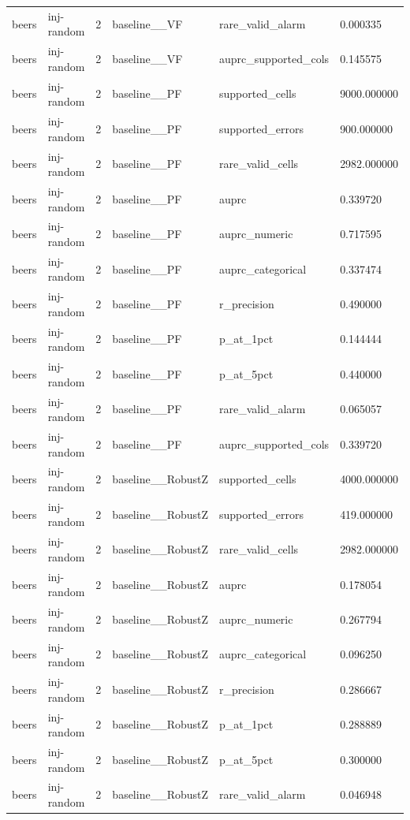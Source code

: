 \begin{tabular}{llllll}
beers & inj-random & 2 & baseline\_\_VF & rare\_valid\_alarm & 0.000335 \\
beers & inj-random & 2 & baseline\_\_VF & auprc\_supported\_cols & 0.145575 \\
beers & inj-random & 2 & baseline\_\_PF & supported\_cells & 9000.000000 \\
beers & inj-random & 2 & baseline\_\_PF & supported\_errors & 900.000000 \\
beers & inj-random & 2 & baseline\_\_PF & rare\_valid\_cells & 2982.000000 \\
beers & inj-random & 2 & baseline\_\_PF & auprc & 0.339720 \\
beers & inj-random & 2 & baseline\_\_PF & auprc\_numeric & 0.717595 \\
beers & inj-random & 2 & baseline\_\_PF & auprc\_categorical & 0.337474 \\
beers & inj-random & 2 & baseline\_\_PF & r\_precision & 0.490000 \\
beers & inj-random & 2 & baseline\_\_PF & p\_at\_1pct & 0.144444 \\
beers & inj-random & 2 & baseline\_\_PF & p\_at\_5pct & 0.440000 \\
beers & inj-random & 2 & baseline\_\_PF & rare\_valid\_alarm & 0.065057 \\
beers & inj-random & 2 & baseline\_\_PF & auprc\_supported\_cols & 0.339720 \\
beers & inj-random & 2 & baseline\_\_RobustZ & supported\_cells & 4000.000000 \\
beers & inj-random & 2 & baseline\_\_RobustZ & supported\_errors & 419.000000 \\
beers & inj-random & 2 & baseline\_\_RobustZ & rare\_valid\_cells & 2982.000000 \\
beers & inj-random & 2 & baseline\_\_RobustZ & auprc & 0.178054 \\
beers & inj-random & 2 & baseline\_\_RobustZ & auprc\_numeric & 0.267794 \\
beers & inj-random & 2 & baseline\_\_RobustZ & auprc\_categorical & 0.096250 \\
beers & inj-random & 2 & baseline\_\_RobustZ & r\_precision & 0.286667 \\
beers & inj-random & 2 & baseline\_\_RobustZ & p\_at\_1pct & 0.288889 \\
beers & inj-random & 2 & baseline\_\_RobustZ & p\_at\_5pct & 0.300000 \\
beers & inj-random & 2 & baseline\_\_RobustZ & rare\_valid\_alarm & 0.046948 \\

\end{tabular}
